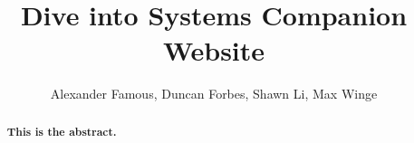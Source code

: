 \documentclass[sigconf]{aamas}
\begin{document}
\title{Dive into Systems Companion Website}

\author{Alexander Famous, Duncan Forbes, Shawn Li, Max Winge}

\begin{abstract}
\textbf{
This is the abstract. }
\end{abstract}



\maketitle



\end{document}
